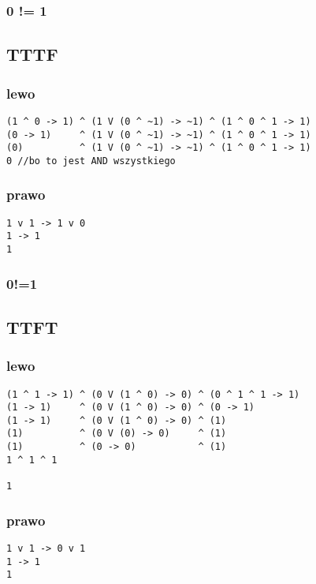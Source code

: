 \documentclass[11pt]{article}
\begin{document}
\subsubsection{0 != 1}
\label{sec:org80fbaf9}

\subsection{TTTF}
\label{sec:org48a26ad}
\subsubsection{lewo}
\label{sec:org4bd87dd}
\begin{verbatim}
(1 ^ 0 -> 1) ^ (1 V (0 ^ ~1) -> ~1) ^ (1 ^ 0 ^ 1 -> 1)
(0 -> 1)     ^ (1 V (0 ^ ~1) -> ~1) ^ (1 ^ 0 ^ 1 -> 1)
(0)          ^ (1 V (0 ^ ~1) -> ~1) ^ (1 ^ 0 ^ 1 -> 1)
0 //bo to jest AND wszystkiego
\end{verbatim}

\subsubsection{prawo}
\label{sec:orgcf5ba40}
\begin{verbatim}
1 v 1 -> 1 v 0
1 -> 1
1
\end{verbatim}
\subsubsection{0!=1}
\label{sec:org89cbaa3}
\subsection{TTFT}
\label{sec:org6795928}
\subsubsection{lewo}
\label{sec:org8c18315}
\begin{verbatim}
(1 ^ 1 -> 1) ^ (0 V (1 ^ 0) -> 0) ^ (0 ^ 1 ^ 1 -> 1)
(1 -> 1)     ^ (0 V (1 ^ 0) -> 0) ^ (0 -> 1)
(1 -> 1)     ^ (0 V (1 ^ 0) -> 0) ^ (1)
(1)          ^ (0 V (0) -> 0)     ^ (1)
(1)          ^ (0 -> 0)           ^ (1)
1 ^ 1 ^ 1

1
\end{verbatim}
\subsubsection{prawo}
\label{sec:org729d5a9}
\begin{verbatim}
1 v 1 -> 0 v 1
1 -> 1
1
\end{verbatim}
\end{document}
